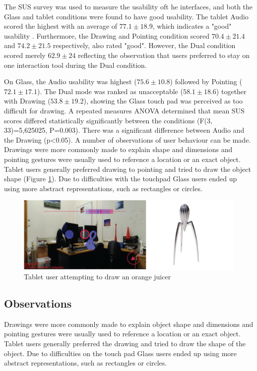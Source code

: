 The SUS survey was used to measure the usability oft he interfaces, and both the Glass and tablet conditions were found to have good usability. The tablet Audio scored the highest with an average of $77.1\pm18.9$, which indicates a "good" usability \cite{Bangor2008}. Furthermore, the Drawing and Pointing condition scored $70.4\pm21.4$ and $74.2\pm21.5$ respectively, also rated "good". However, the Dual condition scored merely $62.9\pm24$ reflecting the observation that users preferred to stay on one interaction tool during the Dual condition.

On Glass, the Audio usability was highest ($75.6\pm10.8$) followed by Pointing ($72.1\pm17.1$). The Dual mode was ranked as unacceptable ($58.1\pm18.6$) together with Drawing ($53.8\pm19.2$), showing the Glass touch pad was perceived as too difficult for drawing. A repeated measures ANOVA determined that mean SUS scores differed statistically significantly between the conditions (F(3, 33)=5,625025, P=0.003). There was a significant difference between Audio and the Drawing (p<0.05). A number of observations of user behaviour can be made. Drawings were more commonly made to explain shape and dimensions and pointing gestures were usually used to reference a location or an exact object. Tablet users generally preferred drawing to pointing and tried to draw the object shape (Figure \ref{fig:ismar14:tablet-drawing}). Due to difficulties with the touchpad Glass users ended up using more abstract representations, such as rectangles or circles.

\begin{figure}[ht]
	\centering
	\includegraphics[width=\linewidth]{images/ismar14/tablet-drawing}
	\caption{Tablet user attempting to draw an orange juicer}
	\label{fig:ismar14:tablet-drawing}
\end{figure}

\subsection{Observations}

Drawings were more commonly made to explain object shape and dimensions and pointing gestures were usually used to reference a location or an exact object. Tablet users generally preferred the drawing and tried to draw the shape of the object. Due to difficulties on the touch pad Glass users ended up using more abstract representations, such as rectangles or circles.


